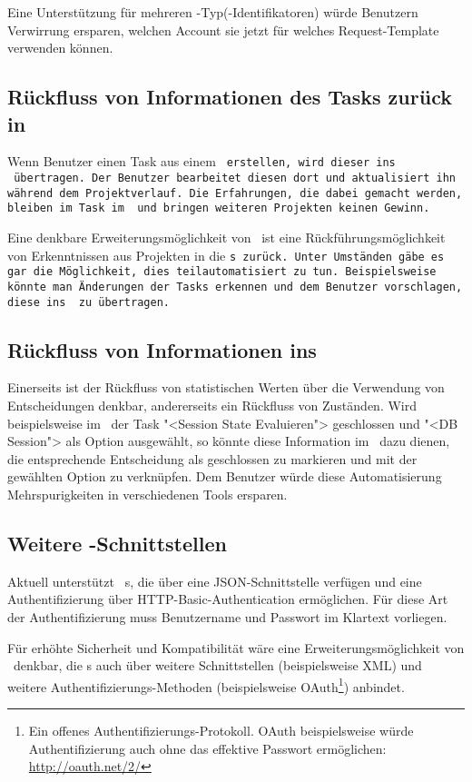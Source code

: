 			Eine Unterstützung für mehreren \ppt-Typ(-Identifikatoren) würde Benutzern Verwirrung ersparen,
			welchen Account sie jetzt für welches Request-Template verwenden können.
			
			
		\subsection{Rückfluss von Informationen des Tasks zurück in \tt}
		\label{subsec:informationFlowbackFeature}
			Wenn Benutzer einen Task aus einem \tt\ erstellen, wird dieser ins \ppt\ übertragen.
			Der Benutzer bearbeitet diesen dort und aktualisiert ihn während dem Projektverlauf.
			Die Erfahrungen, die dabei gemacht werden, bleiben im Task im \ppt\
			und bringen weiteren Projekten keinen Gewinn.
			
			Eine denkbare Erweiterungsmöglichkeit von \eeppi\ ist eine Rückführungsmöglichkeit von
			Erkenntnissen aus Projekten in die \tt s zurück.
			Unter Umständen gäbe es gar die Möglichkeit, dies teilautomatisiert zu tun.
			Beispielsweise könnte man Änderungen der Tasks erkennen und dem Benutzer vorschlagen, diese ins \eeppi\ zu übertragen.
			
			
		\subsection{Rückfluss von Informationen ins \dks}
		\label{subsec:informationFlowbackFeatureDKS}
			Einerseits ist der Rückfluss von statistischen Werten über die Verwendung von Entscheidungen denkbar, 
			andererseits ein Rückfluss von Zuständen.
			Wird beispielsweise im \ppt\ der Task "<Session State Evaluieren"> geschlossen und "<DB Session"> als Option ausgewählt, 
			so könnte diese Information im \dks\ dazu dienen, 
			die entsprechende Entscheidung als geschlossen zu markieren und mit der gewählten Option zu verknüpfen.
			Dem Benutzer würde diese Automatisierung Mehrspurigkeiten in verschiedenen Tools ersparen.


		\subsection{Weitere \ppt-Schnittstellen}
		\label{subsec:morePPTInterfaces}
			Aktuell unterstützt \eeppi\ \ppt s, die über eine JSON-Schnittstelle verfügen
			und eine Authentifizierung über HTTP-Basic-Authentication ermöglichen.
			Für diese Art der Authentifizierung muss Benutzername und Passwort im Klartext vorliegen.
			
			Für erhöhte Sicherheit und Kompatibilität wäre eine Erweiterungsmöglichkeit von \eeppi\ denkbar,
			die \ppt s auch über weitere Schnittstellen (beispielsweise XML)
			und weitere Authentifizierungs-Methoden (beispielsweise OAuth\footnote{Ein offenes Authentifizierungs-Protokoll. OAuth beispielsweise würde Authentifizierung auch ohne das effektive Passwort ermöglichen: \url{http://oauth.net/2/}}) anbindet.
			
